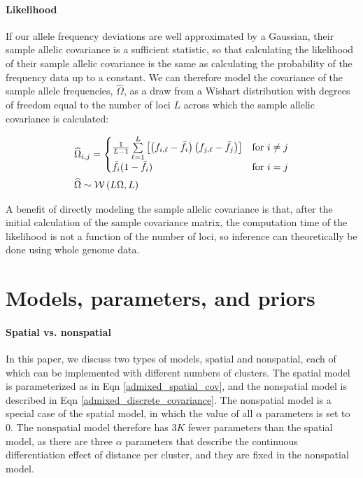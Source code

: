 \documentclass[12pt]{article}
\begin{document}
\paragraph{Likelihood}
If our allele frequency deviations are well approximated by a Gaussian, 
their sample allelic covariance is a sufficient statistic,
so that calculating the likelihood of their sample allelic covariance is the same as 
calculating the probability of the frequency data up to a constant. 
We can therefore model the covariance of the sample allele frequencies, $\widehat{\Omega}$, 
as a draw from a Wishart distribution with degrees of freedom equal to 
the number of loci $L$ across which the sample allelic covariance is calculated:

\begin{align}
&\widehat{\Omega}_{i,j} = 
	\begin{cases}
		\frac{1}{L-1}
		\sum\limits_{\ell=1}^{L}{\left[ 	\left(f_{i,\ell} - \bar{f}_{i} \right)
		 	\left(f_{j,\ell} - \bar{f}_{j} \right)\right] \notag
			} & \text{for } i \neq j \\
		\bar{f}_i (1-\bar{f}_i) & \text{for } i = j \\
	\end{cases}\\
&\widehat{\Omega} \sim \mathcal{W}\left( L\Omega, L	\right)
\label{wishart}
\end{align}

A benefit of directly modeling the sample allelic covariance is that, 
after the initial calculation of the sample covariance matrix,
the computation time of the likelihood is not a function of the number of loci,
so inference can theoretically be done using whole genome data.

\section{Models, parameters, and priors}\label{model_app}
\paragraph{Spatial vs. nonspatial}
In this paper, we discuss two types of models, spatial and nonspatial, 
each of which can be implemented with different numbers of clusters.
The spatial model is parameterized as in Eqn \ref{admixed_spatial_cov},
and the nonspatial model is described in Eqn \ref{admixed_discrete_covariance}.
The nonspatial model is a special case of the spatial model, 
in which the value of all $\alpha$ parameters is set to 0.
The nonspatial model therefore has $3K$ fewer parameters than the spatial model,
as there are three $\alpha$ parameters that describe the continuous differentiation effect of distance per cluster,
and they are fixed in the nonspatial model.
\end{document}
